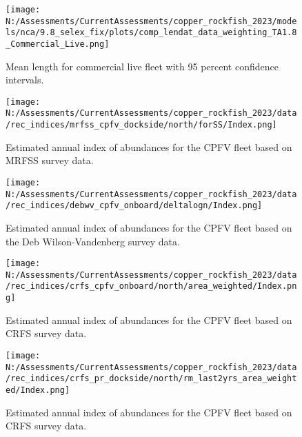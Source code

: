 \documentclass[11pt,
  english,
  letterpaper,
]{article}
\begin{document}
\pagebreak

\begin{figure}
\centering
\texttt{[image: N:/Assessments/CurrentAssessments/copper\_rockfish\_2023/models/nca/9.8\_selex\_fix/plots/comp\_lendat\_data\_weighting\_TA1.8\_Commercial\_Live.png]}
\caption{Mean length for commercial live fleet with 95 percent confidence intervals.\label{fig:mean-com-live-len-data}}
\end{figure}

\pagebreak

\begin{figure}
\centering
\texttt{[image: N:/Assessments/CurrentAssessments/copper\_rockfish\_2023/data/rec\_indices/mrfss\_cpfv\_dockside/north/forSS/Index.png]}
\caption{Estimated annual index of abundances for the CPFV fleet based on MRFSS survey data.\label{fig:mrfss-index-main}}
\end{figure}

\pagebreak

\begin{figure}
\centering
\texttt{[image: N:/Assessments/CurrentAssessments/copper\_rockfish\_2023/data/rec\_indices/debwv\_cpfv\_onboard/deltalogn/Index.png]}
\caption{Estimated annual index of abundances for the CPFV fleet based on the Deb Wilson-Vandenberg survey data.\label{fig:dwv-index-main}}
\end{figure}

\pagebreak

\begin{figure}
\centering
\texttt{[image: N:/Assessments/CurrentAssessments/copper\_rockfish\_2023/data/rec\_indices/crfs\_cpfv\_onboard/north/area\_weighted/Index.png]}
\caption{Estimated annual index of abundances for the CPFV fleet based on CRFS survey data.\label{fig:crfs-index-main}}
\end{figure}

\pagebreak

\begin{figure}
\centering
\texttt{[image: N:/Assessments/CurrentAssessments/copper\_rockfish\_2023/data/rec\_indices/crfs\_pr\_dockside/north/rm\_last2yrs\_area\_weighted/Index.png]}
\caption{Estimated annual index of abundances for the CPFV fleet based on CRFS survey data.\label{fig:crfs-pr-index-main}}
\end{figure}

\pagebreak
\end{document}
